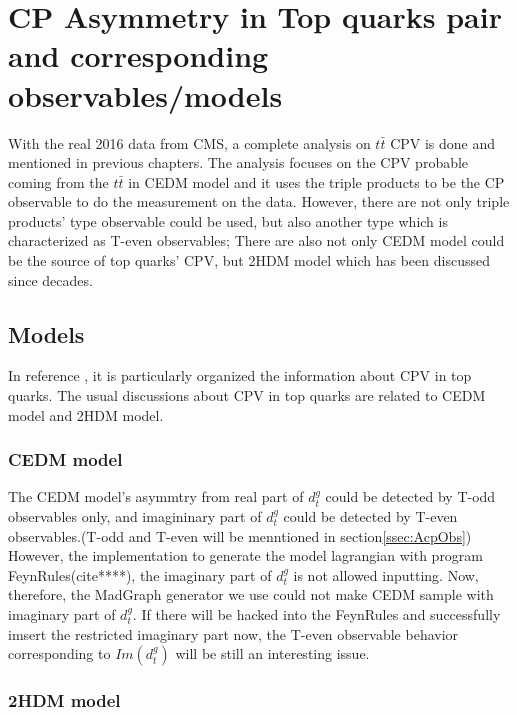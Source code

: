 

\section{CP Asymmetry in Top quarks pair and corresponding observables/models}
\label{sec:AcpModelObs}

	With the real 2016 data from CMS, a complete analysis on $t\bar{t}$ CPV is done and mentioned in previous chapters. The analysis focuses on the CPV probable coming from the $t\bar{t}$ in CEDM model and it uses the triple products to be the CP observable to do the measurement on the data. However, there are not only triple products' type observable could be used, but also another type which is characterized as T-even observables; There are also not only CEDM model could be the source of top quarks' CPV, but 2HDM model which has been discussed since decades. 

	\subsection{Models}
	\label{ssec:AcpModel}

		In reference \cite{Atwood:2000tu}, it is particularly organized the information about CPV in top quarks. The usual discussions about CPV in top quarks are related to CEDM model and 2HDM model.

		\subsubsection{ CEDM model}
		\label{sssec:AcpModel_CEDM}



			The CEDM model's asymmtry from real part of $d_t^g$ could be detected by T-odd observables only, and imagininary part of $d_t^g$ could be detected by T-even observables.(T-odd and T-even will be menntioned in section\ref{ssec:AcpObs}) However, the implementation to generate the model lagrangian with program FeynRules(cite****), the imaginary part of $d_t^g$ is not allowed inputting. Now, therefore, the MadGraph generator we use could not make CEDM sample with imaginary part of $d_t^g$. If there will be hacked into the FeynRules and successfully imsert the restricted imaginary part now, the T-even observable behavior corresponding to $Im(d_t^g)$ will be still an interesting issue.

		\subsubsection{ 2HDM model}
		\label{sssec:AcpModel_2HDM}

